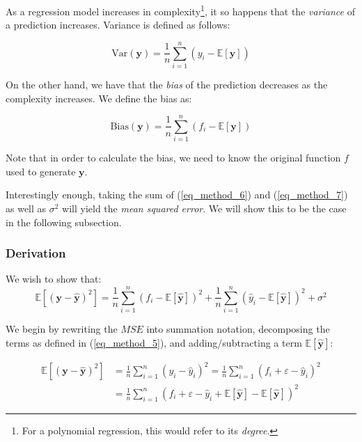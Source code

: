 \documentclass[a4paper,10pt,english]{article}
\begin{document}
As a regression model increases in complexity\footnote{For a polynomial regression, this would refer to its \textit{degree}.}, it so happens that the \textit{variance} of a prediction increases.  Variance is defined as follows:

\begin{equation}
\label{eq_method_6}
\text{Var}(\mathbf{y}) = \frac{1}{n} \sum_{i=1}^{n} (y_i - \mathbb{E}[\mathbf{y}] )
\end{equation}

On the other hand, we have that the \textit{bias} of the prediction decreases as the complexity increases.  We define the bias as:

\begin{equation}
\label{eq_method_7}
\text{Bias}(\mathbf{y}) = \frac{1}{n} \sum_{i=1}^{n} (f_i - \mathbb{E}[\mathbf{y}] )
\end{equation}

Note that in order to calculate the bias, we need to know the original function $f$ used to generate $\mathbf{y}$.

Interestingly enough, taking the sum of (\ref{eq_method_6}) and (\ref{eq_method_7}) as well as $\sigma^2$ will yield the \textit{mean squared error}.  We will show this to be the case in the following subsection.

\subsubsection{Derivation}

We wish to show that:
\begin{equation}
\label{eq_method_8}
\mathbb{E}\left[(\mathbf{y}-\hat{\mathbf{y}})^{2}\right]
=\frac{1}{n} \sum_{i=1}^{n}(f_{i}-\mathbb{E}[\hat{\mathbf{y}}])^{2}+\frac{1}{n} \sum_{i=1}^{n}(\hat{y}_{i}-\mathbb{E}[\hat{\mathbf{y}}])^{2}+\sigma^{2}
\end{equation}

We begin by rewriting the $MSE$ into summation notation, decomposing the terms as defined in (\ref{eq_method_5}), and adding/subtracting a term $\mathbb{E}[\hat{\mathbf{y}}]$:

\begin{align*}
\mathbb{E}\left[(\mathbf{y}-\hat{\mathbf{y}})^{2}\right] &= \frac{1}{n} \sum_{i=1}^{n} ( y_i - \hat{y}_i )^2 = \frac{1}{n} \sum_{i=1}^{n} ( f_i + \varepsilon - \hat{y}_i )^2 \\
&= \frac{1}{n} \sum_{i=1}^{n} ( f_i + \varepsilon - \hat{y}_i  + \mathbb{E}[\hat{\mathbf{y}}] - \mathbb{E}[\hat{\mathbf{y}}] )^2
\end{align*}
\end{document}
